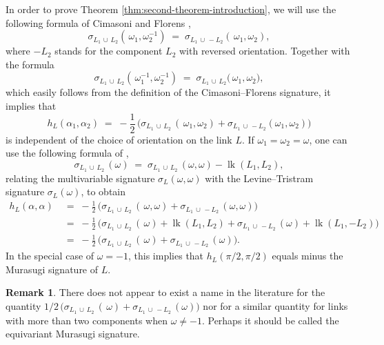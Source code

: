 \documentclass[11pt,reqno]{amsart}
\theoremstyle{definition}
\newtheorem{remark}[theorem]{Remark}
\newcommand{\lk}{\operatorname{lk}}
\begin{document}
\begin{sloppypar}
In order to prove Theorem \ref{thm:second-theorem-introduction}, we will use the following formula of Cimasoni and Florens \cite[Proposition 2.8]{Cimasoni-Florens}, 
\[
\sigma_{L_1\,\cup\, L_2} \left(\, \omega_1, \omega_2^{-1} \right)\; = \; \sigma_{L_1\, \cup\, -L_2}\left(\, \omega_1, \omega_2 \right),
\]
where $-L_2$ stands for the component $L_2$ with reversed orientation. Together with the formula
\[
\sigma_{L_1\,\cup\, L_2} \left(\, \omega_1^{-1}, \omega_2^{-1} \right)\; = \; \sigma_{L_1\, \cup\, L_2}\big(\, \omega_1, \omega_2 \big),
\]
which easily follows from the definition of the Cimasoni--Florens signature, it implies that
\[
h_L (\alpha_1, \alpha_2) \; = \; - \frac{1}{2}\, \big(\sigma_{L_1\,\cup\,L_2}\, (\,\omega_1, \omega_2) + \sigma_{L_1\,\cup\,-L_2} (\omega_1, \omega_2) \big)
\]
is independent of the choice of orientation on the link $L$. If $\omega_1 = \omega_2 = \omega$, one can use the following formula of \cite[Proposition 2.5]{Cimasoni-Florens},
\[
\sigma_{L_1\,\cup\,L_2}\, (\omega)\; = \; \sigma_{L_1\,\cup\,L_2}\, (\omega,\omega) - \lk (L_1,L_2),
\]
relating the multivariable signature $\sigma_L (\omega,\omega)$ with the Levine--Tristram signature $\sigma_L (\omega)$, to obtain
\begin{align*}
h_L (\alpha, \alpha)\; & = \; - \frac{1}{2}\, \big(\sigma_{L_1\,\cup\,L_2}\, (\,\omega, \omega) + \sigma_{L_1\,\cup\,-L_2}\, (\omega, \omega) \big) \\
& = \; - \frac{1}{2}\, \big(\sigma_{L_1\,\cup\,L_2}\, (\,\omega) + \lk (L_1,L_2) + \sigma_{L_1\,\cup\,-L_2}\, (\omega) + \lk (L_1,-L_2) \big) \\
& = \; - \frac{1}{2}\, \big(\sigma_{L_1\,\cup\,L_2}\, (\,\omega) + \sigma_{L_1\,\cup\,-L_2}\, (\omega) \big).
\end{align*}
In the special case of $\omega = -1$, this implies that $h_L (\pi/2, \pi/2)$ equals minus the Murasugi signature of $L$. 

\begin{remark}
There does not appear to exist a name in the literature for the quantity $1/2\, \big(\sigma_{L_1\,\cup\,L_2}\, (\,\omega) + \sigma_{L_1\,\cup\,-L_2}\, (\omega) \big)$ nor for a similar quantity for links with more than two components when $\omega \ne -1$. Perhaps it should be called the equivariant Murasugi signature. 
\end{remark}


\end{sloppypar}
\end{document}
